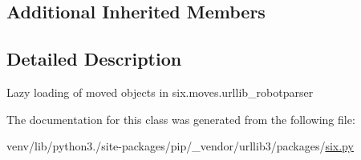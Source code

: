 \subsection*{Additional Inherited Members}


\subsection{Detailed Description}
\begin{DoxyVerb}Lazy loading of moved objects in six.moves.urllib_robotparser\end{DoxyVerb}
 

The documentation for this class was generated from the following file\+:\begin{DoxyCompactItemize}
\item 
venv/lib/python3./site-\/packages/pip/\+\_\+vendor/urllib3/packages/\hyperlink{pip_2__vendor_2urllib3_2packages_2six_8py}{six.\+py}\end{DoxyCompactItemize}
